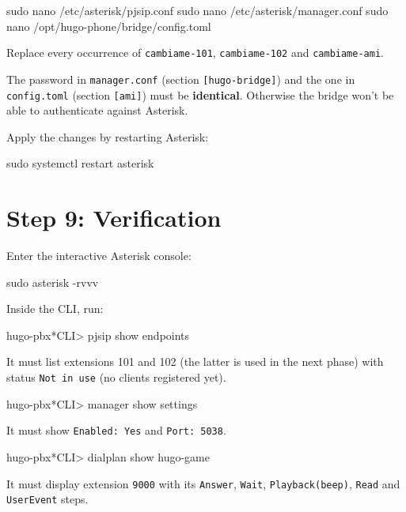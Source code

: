 \begin{shellcode}
sudo nano /etc/asterisk/pjsip.conf
sudo nano /etc/asterisk/manager.conf
sudo nano /opt/hugo-phone/bridge/config.toml
\end{shellcode}

Replace every occurrence of \texttt{cambiame-101}, \texttt{cambiame-102} and \texttt{cambiame-ami}.

\begin{warning}
The password in \texttt{manager.conf} (section \texttt{[hugo-bridge]}) and the one in \texttt{config.toml} (section \texttt{[ami]}) must be \textbf{identical}. Otherwise the bridge won't be able to authenticate against Asterisk.
\end{warning}

Apply the changes by restarting Asterisk:

\begin{shellcode}
sudo systemctl restart asterisk
\end{shellcode}

\section{Step 9: Verification}

Enter the interactive Asterisk console:

\begin{shellcode}
sudo asterisk -rvvv
\end{shellcode}

Inside the CLI, run:

\begin{plaincode}
hugo-pbx*CLI> pjsip show endpoints
\end{plaincode}

It must list extensions 101 and 102 (the latter is used in the next phase) with status \texttt{Not in use} (no clients registered yet).

\begin{plaincode}
hugo-pbx*CLI> manager show settings
\end{plaincode}

It must show \texttt{Enabled: Yes} and \texttt{Port: 5038}.

\begin{plaincode}
hugo-pbx*CLI> dialplan show hugo-game
\end{plaincode}

It must display extension \texttt{9000} with its \texttt{Answer}, \texttt{Wait}, \texttt{Playback(beep)}, \texttt{Read} and \texttt{UserEvent} steps.

